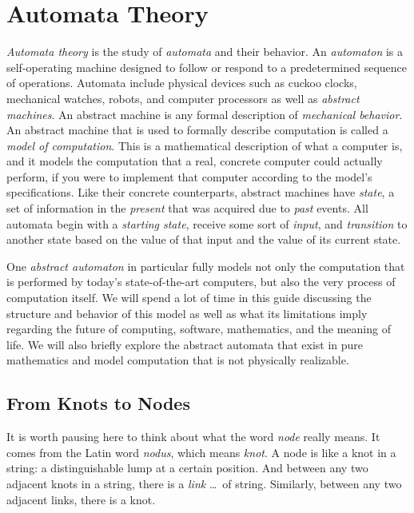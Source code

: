 \chapter{Automata Theory}

\textit{Automata theory} is the study of \textit{automata} and their behavior. An \textit{automaton} is a self-operating machine designed to follow or respond to a predetermined sequence of operations. Automata include physical devices such as cuckoo clocks, mechanical watches, robots, and computer processors as well as \textit{abstract machines}. An abstract machine is any formal description of \textit{mechanical behavior}. An abstract machine that is used to formally describe computation is called a \textit{model of computation}. This is a mathematical description of what a computer is, and it models the computation that a real, concrete computer could actually perform, if you were to implement that computer according to the model's specifications. Like their concrete counterparts, abstract machines have \textit{state}, a set of information in the \textit{present} that was acquired due to \textit{past} events. All automata begin with a \textit{starting state}, receive some sort of \textit{input}, and \textit{transition} to another state based on the value of that input and the value of its current state.

One \textit{abstract automaton} in particular fully models not only the computation that is performed by today's state-of-the-art computers, but also the very process of computation itself. We will spend a lot of time in this guide discussing the structure and behavior of this model as well as what its limitations imply regarding the future of computing, software, mathematics, and the meaning of life. We will also briefly explore the abstract automata that exist in pure mathematics and model computation that is not physically realizable.

\section{From Knots to Nodes}

It is worth pausing here to think about what the word \textit{node} really means. It comes from the Latin word \textit{nodus}, which means \textit{knot}. A node is like a knot in a string: a distinguishable lump at a certain position. And between any two adjacent knots in a string, there is a \textit{link} \dots\ of string. Similarly, between any two adjacent links, there is a knot.

